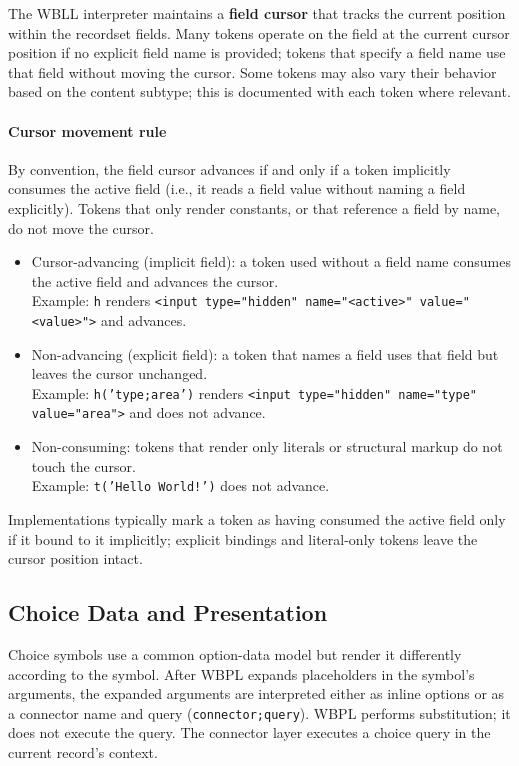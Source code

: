 The WBLL interpreter maintains a \textbf{field cursor} that tracks the current position within the recordset fields. Many tokens operate on the field at the current cursor position if no explicit field name is provided; tokens that specify a field name use that field without moving the cursor. Some tokens may also vary their behavior based on the content subtype; this is documented with each token where relevant.

\paragraph{Cursor movement rule}
By convention, the field cursor advances if and only if a token implicitly consumes the active field (i.e., it reads a field value without naming a field explicitly). Tokens that only render constants, or that reference a field by name, do not move the cursor.

\begin{itemize}
  \item Cursor-advancing (implicit field): a token used without a field name consumes the active field and advances the cursor.\\
  Example: \texttt{h} renders \texttt{<input type="hidden" name="<active>" value="<value>">} and advances.
  \item Non-advancing (explicit field): a token that names a field uses that field but leaves the cursor unchanged.\\
  Example: \texttt{h('type;area')} renders \texttt{<input type="hidden" name="type" value="area">} and does not advance.
  \item Non-consuming: tokens that render only literals or structural markup do not touch the cursor.\\
  Example: \texttt{t('Hello World!')} does not advance.
\end{itemize}

Implementations typically mark a token as having consumed the active field only if it bound to it implicitly; explicit bindings and literal-only tokens leave the cursor position intact.

\subsection{Choice Data and Presentation}
\label{sec:wbll-choice-data}

Choice symbols use a common option-data model but render it differently according to the symbol. After WBPL expands placeholders in the symbol's arguments, the expanded arguments are interpreted either as inline options or as a connector name and query (\texttt{connector;query}). WBPL performs substitution; it does not execute the query. The connector layer executes a choice query in the current record's context.

